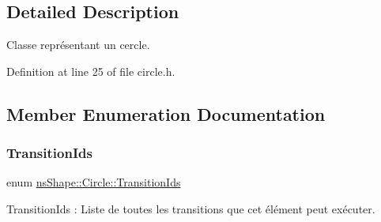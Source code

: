 \subsection{Detailed Description}
Classe représentant un cercle. 

Definition at line 25 of file circle.\+h.



\subsection{Member Enumeration Documentation}
\mbox{\label{classns_shape_1_1_circle_a65ce20b6f5c10a111c1542f06154a235}} 
\subsubsection{\texorpdfstring{Transition\+Ids}{TransitionIds}}
{\footnotesize\ttfamily enum \hyperlink{classns_shape_1_1_circle_a65ce20b6f5c10a111c1542f06154a235}{ns\+Shape\+::\+Circle\+::\+Transition\+Ids}}



Transition\+Ids \+: Liste de toutes les transitions que cet élément peut exécuter. 

